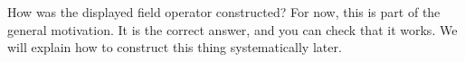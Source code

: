 How was the displayed field operator constructed?
For now, this is part of the general motivation. It is the correct answer, and
you can check that it works. We will explain how to construct this
thing systematically later.

